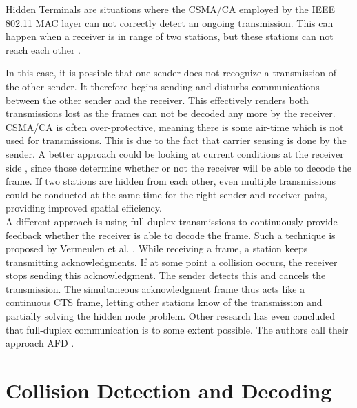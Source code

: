 Hidden Terminals are situations where the \gls{CSMA/CA} employed by the IEEE 802.11 \gls{MAC} layer can not correctly detect an ongoing transmission. This can happen when a receiver is in range of two stations, but these stations can not reach each other \cite{perahia2013}.

In this case, it is possible that one sender does not recognize a transmission of the other sender. It therefore begins sending and disturbs communications between the other sender and the receiver. This effectively renders both transmissions lost as the frames can not be decoded any more by the receiver.\\

\gls{CSMA/CA} is often over-protective, meaning there is some air-time which is not used for transmissions. This is due to the fact that carrier sensing is done by the sender. A better approach could be looking at current conditions at the receiver side \cite{halperin2007}, since those determine whether or not the receiver will be able to decode the frame. If two stations are hidden from each other, even multiple transmissions could be conducted at the same time for the right sender and receiver pairs, providing improved spatial efficiency.\\

A different approach is using full-duplex transmissions to continuously provide feedback whether the receiver is able to decode the frame. Such a technique is proposed by Vermeulen et al. \cite{vermeulen2016}. While receiving a frame, a station keeps transmitting acknowledgments. If at some point a collision occurs, the receiver stops sending this acknowledgment. The sender detects this and cancels the transmission. The simultaneous acknowledgment frame thus acts like a continuous CTS frame, letting other stations know of the transmission and partially solving the hidden node problem. Other research has even concluded that full-duplex communication is to some extent possible. The authors call their approach \gls{AFD} \cite{lv2014}.



\section{Collision Detection and Decoding}

